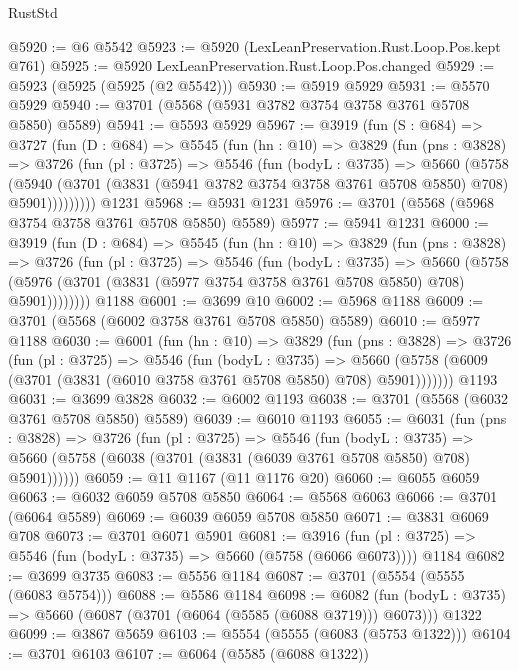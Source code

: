 \begin{lexlean}{RustStd}
\begin{coremodule}
{\begin{coremodule}
{{{{{{{{{{{{{{@5920 := @6 @5542
@5923 := @5920 (LexLeanPreservation.Rust.Loop.Pos.kept @761)
@5925 := @5920 LexLeanPreservation.Rust.Loop.Pos.changed
@5929 := @5923 (@5925 (@5925 (@2 @5542)))
@5930 := @5919 @5929
@5931 := @5570 @5929
@5940 := @3701 (@5568 (@5931 @3782 @3754 @3758 @3761 @5708 @5850) @5589)
@5941 := @5593 @5929
@5967 := @3919
    (fun (S : @684) =>
    @3727
      (fun (D : @684) =>
      @5545
        (fun (hn : @10) =>
        @3829
          (fun (pns : @3828) =>
          @3726
            (fun (pl : @3725) =>
            @5546
              (fun (bodyL : @3735) =>
              @5660
                (@5758
                  (@5940
                    (@3701 (@3831 (@5941 @3782 @3754 @3758 @3761 @5708 @5850) @708) @5901)))))))))
    @1231
@5968 := @5931 @1231
@5976 := @3701 (@5568 (@5968 @3754 @3758 @3761 @5708 @5850) @5589)
@5977 := @5941 @1231
@6000 := @3919
    (fun (D : @684) =>
    @5545
      (fun (hn : @10) =>
      @3829
        (fun (pns : @3828) =>
        @3726
          (fun (pl : @3725) =>
          @5546
            (fun (bodyL : @3735) =>
            @5660
              (@5758 (@5976 (@3701 (@3831 (@5977 @3754 @3758 @3761 @5708 @5850) @708) @5901))))))))
    @1188
@6001 := @3699 @10
@6002 := @5968 @1188
@6009 := @3701 (@5568 (@6002 @3758 @3761 @5708 @5850) @5589)
@6010 := @5977 @1188
@6030 := @6001
    (fun (hn : @10) =>
    @3829
      (fun (pns : @3828) =>
      @3726
        (fun (pl : @3725) =>
        @5546
          (fun (bodyL : @3735) =>
          @5660 (@5758 (@6009 (@3701 (@3831 (@6010 @3758 @3761 @5708 @5850) @708) @5901)))))))
    @1193
@6031 := @3699 @3828
@6032 := @6002 @1193
@6038 := @3701 (@5568 (@6032 @3761 @5708 @5850) @5589)
@6039 := @6010 @1193
@6055 := @6031
    (fun (pns : @3828) =>
    @3726
      (fun (pl : @3725) =>
      @5546
        (fun (bodyL : @3735) =>
        @5660 (@5758 (@6038 (@3701 (@3831 (@6039 @3761 @5708 @5850) @708) @5901))))))
@6059 := @11 @1167 (@11 @1176 @20)
@6060 := @6055 @6059
@6063 := @6032 @6059 @5708 @5850
@6064 := @5568 @6063
@6066 := @3701 (@6064 @5589)
@6069 := @6039 @6059 @5708 @5850
@6071 := @3831 @6069 @708
@6073 := @3701 @6071 @5901
@6081 := @3916
    (fun (pl : @3725) => @5546 (fun (bodyL : @3735) => @5660 (@5758 (@6066 @6073))))
    @1184
@6082 := @3699 @3735
@6083 := @5556 @1184
@6087 := @3701 (@5554 (@5555 (@6083 @5754)))
@6088 := @5586 @1184
@6098 := @6082
    (fun (bodyL : @3735) => @5660 (@6087 (@3701 (@6064 (@5585 (@6088 @3719))) @6073)))
    @1322
@6099 := @3867 @5659
@6103 := @5554 (@5555 (@6083 (@5753 @1322)))
@6104 := @3701 @6103
@6107 := @6064 (@5585 (@6088 @1322))
}}}}}}}}}}}}}}
\end{coremodule}}
\end{coremodule}
\end{lexlean}
